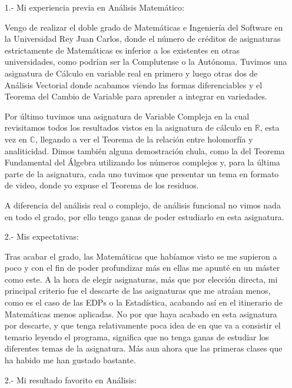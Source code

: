 \documentclass[a4paper,oneside,11pt,leqno]{article}
\begin{document}
\begin{enumerate}

\item[1.-] {  Mi experiencia previa en Análisis Matem\'atico}: 

Vengo de realizar el doble grado de Matemáticas  e Ingeniería del Software en la Universidad Rey Juan Carlos, donde el número de créditos de asignaturas estrictamente de Matemáticas es inferior a los existentes en otras universidades, como podrían ser la Complutense o la Autónoma. Tuvimos una asignatura de Cálculo en variable real en primero y luego otras dos de Análisis Vectorial donde acabamos viendo las formas diferenciables y el Teorema del Cambio de Variable para aprender a integrar en variedades.

Por último tuvimos una asignatura de Variable Compleja en la cual revisitamos todos los resultados vistos en la asignatura de cálculo en $ \mathbb{R} $, esta vez en $ \mathbb{C} $, llegando a ver el Teorema de la relación entre holomorfía y analiticidad. Dimos también alguna demostración chula, como la del Teorema Fundamental del Álgebra utilizando los números complejos y, para la última parte de la asignatura, cada uno tuvimos que presentar un tema en formato de video, donde yo expuse el Teorema de los residuos.

A diferencia del análisis real o complejo, de análisis funcional no vimos nada en todo el grado, por ello tengo ganas de poder estudiarlo en esta asignatura.

\item[2.-] { Mis expectativas}:

Tras acabar el grado, las Matemáticas que habíamos visto se me supieron a poco y con el fin de poder profundizar más en ellas me apunté en un máster como este. A la hora de elegir asignaturas, más que por elección directa, mi principal criterio fue el descarte de las asignaturas que me atraían menos, como es el caso de las EDPs o la Estadística, acabando así en el itinerario de Matemáticas menos aplicadas. No por que haya acabado en esta asignatura por descarte, y que tenga relativamente poca idea de en que va a consistir el temario leyendo el programa, significa que no tenga ganas de estudiar los diferentes temas de la asignatura. Más aun ahora que las primeras clases que ha habido me han gustado bastante.

\item[2.-] { Mi resultado favorito en Análisis}:


\end{enumerate}
\end{document}
